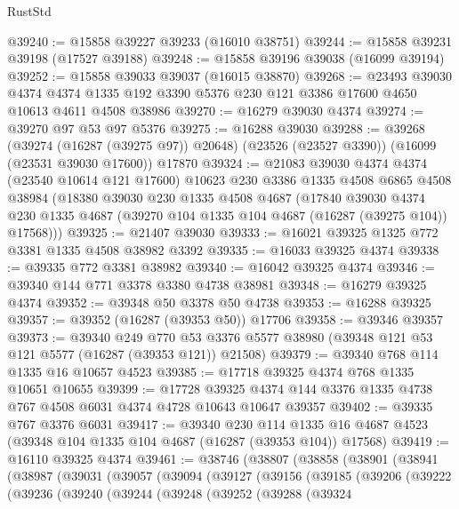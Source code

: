 \begin{lexlean}{RustStd}
\begin{coremodule}
@39240 := @15858 @39227 @39233 (@16010 @38751)
@39244 := @15858 @39231 @39198 (@17527 @39188)
@39248 := @15858 @39196 @39038 (@16099 @39194)
@39252 := @15858 @39033 @39037 (@16015 @38870)
@39268 := @23493
    @39030
    @4374
    @4374
    @1335
    @192
    @3390
    @5376
    @230
    @121
    @3386
    @17600
    @4650
    @10613
    @4611
    @4508
    @38986
@39270 := @16279 @39030 @4374
@39274 := @39270 @97 @53 @97 @5376
@39275 := @16288 @39030
@39288 := @39268
    (@39274 (@16287 (@39275 @97)) @20648)
    (@23526 (@23527 @3390))
    (@16099 (@23531 @39030 @17600))
    @17870
@39324 := @21083
    @39030
    @4374
    @4374
    (@23540 @10614 @121 @17600)
    @10623
    @230
    @3386
    @1335
    @4508
    @6865
    @4508
    @38984
    (@18380
      @39030
      @230
      @1335
      @4508
      @4687
      (@17840
        @39030
        @4374
        @230
        @1335
        @4687
        (@39270 @104 @1335 @104 @4687 (@16287 (@39275 @104)) @17568)))
@39325 := @21407 @39030
@39333 := @16021 @39325 @1325 @772 @3381 @1335 @4508 @38982 @3392
@39335 := @16033 @39325 @4374
@39338 := @39335 @772 @3381 @38982
@39340 := @16042 @39325 @4374
@39346 := @39340 @144 @771 @3378 @3380 @4738 @38981
@39348 := @16279 @39325 @4374
@39352 := @39348 @50 @3378 @50 @4738
@39353 := @16288 @39325
@39357 := @39352 (@16287 (@39353 @50)) @17706
@39358 := @39346 @39357
@39373 := @39340
    @249
    @770
    @53
    @3376
    @5577
    @38980
    (@39348 @121 @53 @121 @5577 (@16287 (@39353 @121)) @21508)
@39379 := @39340 @768 @114 @1335 @16 @10657 @4523
@39385 := @17718 @39325 @4374 @768 @1335 @10651 @10655
@39399 := @17728
    @39325
    @4374
    @144
    @3376
    @1335
    @4738
    @767
    @4508
    @6031
    @4374
    @4728
    @10643
    @10647
    @39357
@39402 := @39335 @767 @3376 @6031
@39417 := @39340
    @230
    @114
    @1335
    @16
    @4687
    @4523
    (@39348 @104 @1335 @104 @4687 (@16287 (@39353 @104)) @17568)
@39419 := @16110 @39325 @4374
@39461 := @38746
    (@38807
      (@38858
        (@38901
          (@38941
            (@38987
              (@39031
                (@39057
                  (@39094
                    (@39127
                      (@39156
                        (@39185
                          (@39206
                            (@39222
                              (@39236
                                (@39240
                                  (@39244
                                    (@39248
                                      (@39252
                                        (@39288
                                          (@39324

\end{coremodule}
\end{lexlean}
